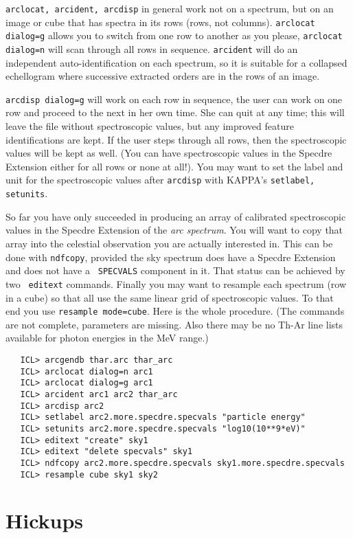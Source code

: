 {\tt arclocat, arcident, arcdisp} in general work not on a spectrum, but
on an image or cube that has spectra in its rows (rows, not columns).
{\tt arclocat dialog=g} allows you to switch from one row to another as
you please, {\tt arclocat dialog=n} will scan through all rows in
sequence.  {\tt arcident} will do an independent auto-identification on
each spectrum, so it is suitable for a collapsed echellogram where
successive extracted orders are in the rows of an image.

{\tt arcdisp dialog=g} will work on each row in sequence, the user can
work on one row and proceed to the next in her own time.  She can quit
at any time; this will leave the file without spectroscopic values, but
any improved feature identifications are kept.  If the user steps
through all rows, then the spectroscopic values will be kept as well.
(You can have spectroscopic values in the Specdre Extension either for
all rows or none at all!).  You may want to set the label and unit for
the spectroscopic values after {\tt arcdisp} with KAPPA's {\tt setlabel,
setunits}.

So far you have only succeeded in producing an array of calibrated
spectroscopic values in the Specdre Extension of the {\it arc spectrum}.
You will want to copy that array into the celestial observation you are
actually interested in.  This can be done with {\tt ndfcopy}, provided
the sky spectrum does have a Specdre Extension and does not have a {\tt
SPECVALS} component in it.  That status can be achieved by two {\tt
editext} commands.  Finally you may want to resample each spectrum (row
in a cube) so that all use the same linear grid of spectroscopic values.
To that end you use {\tt resample mode=cube}.  Here is the whole
procedure.  (The commands are not complete, parameters are missing.  Also
there may be no Th-Ar line lists available for photon energies in the
MeV range.)

\begin{verbatim}
   ICL> arcgendb thar.arc thar_arc
   ICL> arclocat dialog=n arc1
   ICL> arclocat dialog=g arc1
   ICL> arcident arc1 arc2 thar_arc
   ICL> arcdisp arc2
   ICL> setlabel arc2.more.specdre.specvals "particle energy"
   ICL> setunits arc2.more.specdre.specvals "log10(10**9*eV)"
   ICL> editext "create" sky1
   ICL> editext "delete specvals" sky1
   ICL> ndfcopy arc2.more.specdre.specvals sky1.more.specdre.specvals
   ICL> resample cube sky1 sky2
\end{verbatim}


\goodbreak
\section{Hickups}
\label{hickup}

